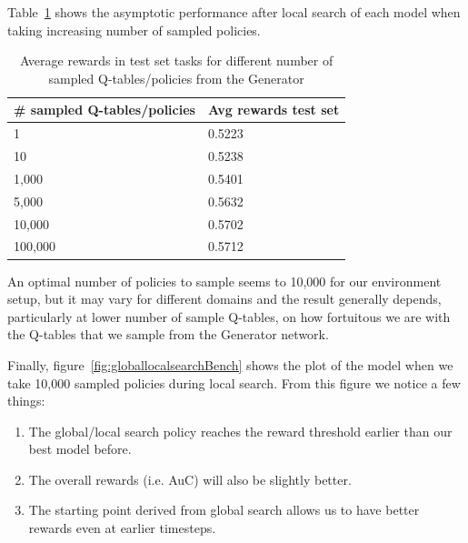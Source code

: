 Table~\ref{tab:avgrewardslocalglobalsearch} shows the asymptotic performance after local search of each model when taking increasing number of sampled policies.

\begin{table}[H]
\centering
\begin{tabular}{@{}ll@{}}
\toprule
\# sampled Q-tables/policies & Avg rewards test set \\ \midrule
1                            & 0.5223               \\
10                           & 0.5238               \\
1,000                        & 0.5401               \\
5,000                        & 0.5632               \\
10,000                       & 0.5702               \\
100,000                      & 0.5712               \\ \bottomrule
\end{tabular}
\caption{Average rewards in test set tasks for different number of sampled Q-tables/policies from the Generator}
\label{tab:avgrewardslocalglobalsearch}
\end{table}

An optimal number of policies to sample seems to 10,000 for our environment setup, but it may vary for different domains and the result generally depends, particularly at lower number of sample Q-tables, on how fortuitous we are with the Q-tables that we sample from the Generator network.

Finally, figure~\ref{fig:globallocalsearchBench} shows the plot of the model when we take 10,000 sampled policies during local search. From this figure we notice a few things:
\begin{enumerate}
	\item The global/local search policy reaches the reward threshold earlier than our best model before.
	\item The overall rewards (i.e. AuC) will also be slightly better.
	\item The starting point derived from global search allows us to have better rewards even at earlier timesteps.
\end{enumerate}

